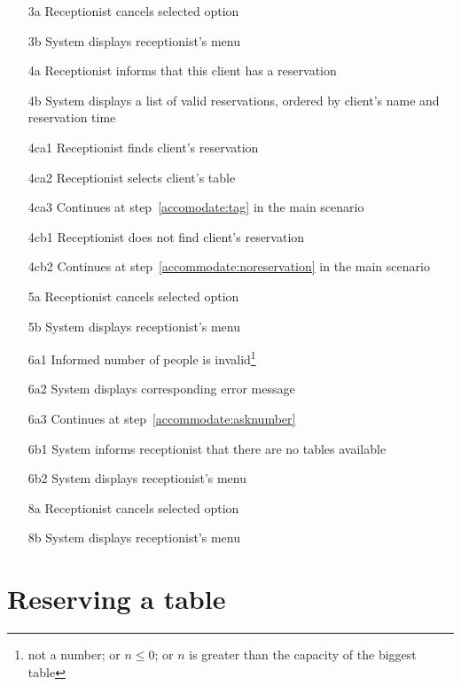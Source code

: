 \documentclass[a4paper,11pt,oneside]{book}
\newcommand{\cancel}[1]{#1 cancels selected option}
\newcommand{\menu}[1]{System displays #1's menu}
\begin{document}
\begin{enumerate}
\item [3a] \cancel{Receptionist}
\item [3b] \menu{receptionist}
\\
\item [4a] Receptionist informs that this client has a reservation
\item [4b] System displays a list of valid reservations, ordered by client's name and reservation time
\\
\item [4ca1] Receptionist finds client's reservation
\item [4ca2] Receptionist selects client's table
\item [4ca3] Continues at step~\ref{accomodate:tag} in the main scenario
\\
\item [4cb1] Receptionist does not find client's reservation
\item [4cb2] Continues at step~\ref{accommodate:noreservation} in the main scenario
\\
\item [5a] \cancel{Receptionist}
\item [5b] \menu{receptionist}
\\
\item [6a1] Informed number of people is invalid\footnote{not a number; or $n \leq 0$; or $n$ is greater than the capacity of the biggest table}
\item [6a2] System displays corresponding error message
\item [6a3] Continues at step~\ref{accommodate:asknumber}
\\
\item [6b1] System informs receptionist that there are no tables available
\item [6b2] \menu{receptionist}
\\
\item [8a] \cancel{Receptionist}
\item [8b] \menu{receptionist}
\\
\end{enumerate}


\chapter{Reserving a table}
\end{document}
